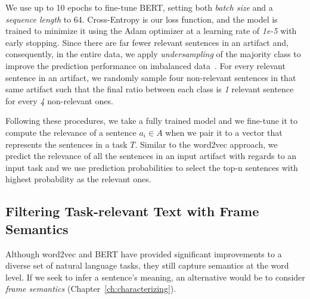 We use up to 10 epochs to fine-tune BERT, setting both \textit{batch size} and a \textit{sequence length} to 64. Cross-Entropy is our loss function, and the model is trained to minimize it using the Adam optimizer at a learning rate of \textit{1e-5} with early stopping. 
Since there are far fewer relevant sentences in an artifact and, consequently,
in the entire data, we apply \textit{undersampling} of the majority class 
to improve the prediction performance on imbalanced data~\cite{tan2015online}.
For every relevant sentence in an artifact, we randomly sample four 
non-relevant sentences in that same artifact such that the final ratio 
between each class is \textit{1} relevant sentence for every \textit{4} non-relevant ones.





Following these procedures, we take a fully trained model and we fine-tune it to compute the relevance of a sentence $a_i \in A$ when we pair it to a vector that represents the sentences in a task $T$.
Similar to the word2vec approach, we predict the relevance of all the sentences in an input artifact with regards to an input task and we use prediction probabilities to select 
the top-n sentences with highest probability as the relevant ones.









\subsection{Filtering Task-relevant Text with Frame Semantics}
\label{cp5:approach-filters}




Although word2vec and BERT have provided significant improvements to a diverse set of natural language tasks, 
they still capture semantics at the word level. 
If we seek to infer a sentence's meaning, an alternative would be to consider  \textit{frame semantics} (Chapter~\ref{ch:characterizing}).


